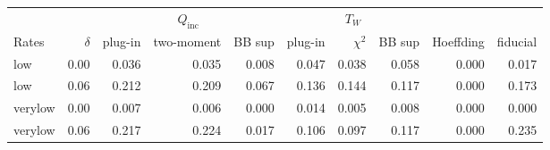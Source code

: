 \begin{tabular}{lrrrrrrrrr}
\toprule
 & & \multicolumn{3}{c}{$Q_{\mathrm{inc}}$} & \multicolumn{3}{c}{$T_W$} & & \\
\cmidrule(lr){3-5}\cmidrule(lr){6-8}
Rates & $\delta$ & plug-in & two-moment & BB sup & plug-in & $\chi^2$ & BB sup & Hoeffding & fiducial \\
\midrule
low & 0.00 & 0.036 & 0.035 & 0.008 & 0.047 & 0.038 & 0.058 & 0.000 & 0.017 \\
low & 0.06 & 0.212 & 0.209 & 0.067 & 0.136 & 0.144 & 0.117 & 0.000 & 0.173 \\
verylow & 0.00 & 0.007 & 0.006 & 0.000 & 0.014 & 0.005 & 0.008 & 0.000 & 0.000 \\
verylow & 0.06 & 0.217 & 0.224 & 0.017 & 0.106 & 0.097 & 0.117 & 0.000 & 0.235 \\
\bottomrule
\end{tabular}
